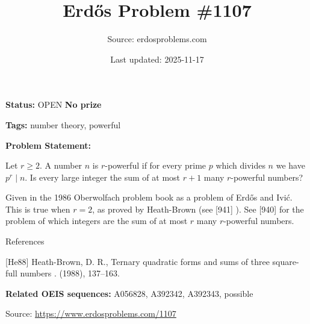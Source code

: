 \documentclass{article}
\title{Erd\H{o}s Problem \#1107}
\date{Last updated: 2025-11-17}
\author{Source: erdosproblems.com}
\begin{document}
\maketitle

\noindent\textbf{Status:} OPEN \quad \textbf{No prize}

\noindent\textbf{Tags:} number theory, powerful

\medskip

\noindent\textbf{Problem Statement:}

Let $r\geq 2$. A number $n$ is $r$-powerful if for every prime $p$ which divides $n$ we have $p^r\mid n$. Is every large integer the sum of at most $r+1$ many $r$-powerful numbers?




Given in the 1986 Oberwolfach problem book as a problem of Erd\H{o}s and Ivi\'{c}. This is true when $r=2$, as proved by Heath-Brown \cite{He88} (see [941] ). See [940] for the problem of which integers are the sum of at most $r$ many $r$-powerful numbers.




References

[He88] Heath-Brown, D. R., Ternary quadratic forms and sums of three square-full numbers . (1988), 137--163.

\noindent\textbf{Related OEIS sequences:} A056828, A392342, A392343, possible


\bigskip
\noindent\small{Source: \url{https://www.erdosproblems.com/1107}}
\end{document}

